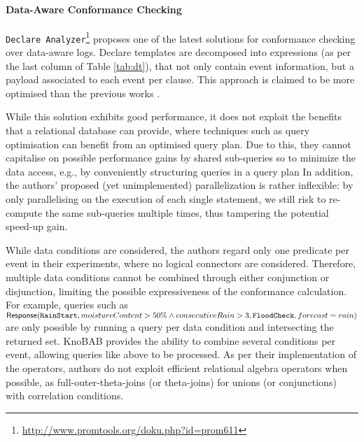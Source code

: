 \paragraph*{Data-Aware Conformance Checking}
\texttt{Declare Analyzer}\footnote{\url{http://www.promtools.org/doku.php?id=prom611}} \cite{BurattinMS16} proposes one of the latest solutions for conformance checking over data-aware logs. Declare templates are decomposed into \LTLf expressions (as per the last column of Table \ref{tab:dt}), that not only contain event information, but a payload associated to each event per clause. %
This approach is claimed to be  more optimised than the previous works \cite{VanDerAalst2005}.%

While this solution exhibits good performance, it does not exploit the benefits that a relational database can provide, where techniques such as query optimisation can benefit from an optimised query plan. Due to this, they cannot capitalise on possible performance gains by shared sub-queries %
so to minimize the data access, e.g., by conveniently %
structuring queries in a query plan \cite{BellatrecheKB21} %
In addition, the authors' proposed (yet unimplemented) parallelization is rather inflexible: by only parallelising on the execution of each single statement, we still risk to re-compute the same sub-queries multiple times, thus tampering the potential speed-up gain.

While data conditions are considered, the authors regard only one predicate per event in their experiments, where no logical connectors are considered. Therefore, multiple data conditions cannot be combined through either conjunction or disjunction, limiting the possible expressiveness of the conformance calculation. For example, queries such as 
$\textsf{Response}(\texttt{RainStart},\\moistureContent>50\% \wedge consecutiveRain>3,\texttt{FloodCheck},forecast=rain)$ 
are only possible by running a query per data condition and intersecting the returned set. KnoBAB provides the ability to combine several conditions per event, allowing queries like above to be processed. As per their implementation of the \LTLf operators, authors do not exploit efficient relational algebra operators when possible, as full-outer-theta-joins (or theta-joins) for unions (or conjunctions) with correlation conditions.

